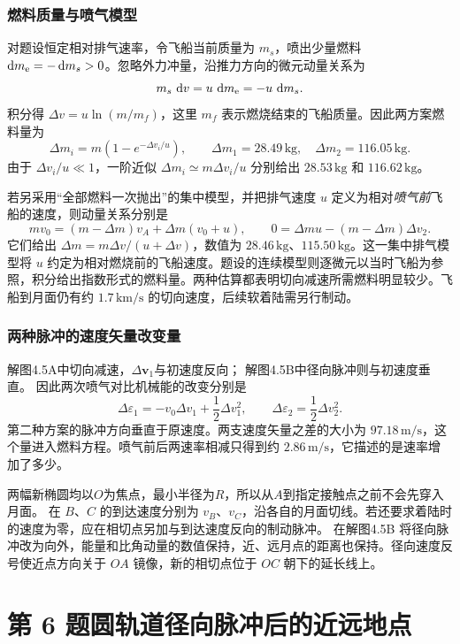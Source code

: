 \documentclass[UTF8,fontset=fandol,a4paper,11pt]{ctexart}
\newcommand{\dd}{\mathop{}\!\mathrm{d}}
\newcommand{\vect}[1]{\bm{#1}}
\begin{document}
\subsubsection*{燃料质量与喷气模型}
对题设恒定相对排气速率，令飞船当前质量为 $m_s$，喷出少量燃料 $\dd m_{\rm e}=-\dd m_s>0$。忽略外力冲量，沿推力方向的微元动量关系为
\[
m_s\,\dd v=u\,\dd m_{\rm e}=-u\,\dd m_s.
\]
积分得 $\Delta v=u\ln(m/m_f)$，这里 $m_f$ 表示燃烧结束的飞船质量。因此两方案燃料量为
\[
\boxed{\Delta m_i=m\left(1-e^{-\Delta v_i/u}\right)},
\qquad \Delta m_1=28.49\,\mathrm{kg},\quad
\Delta m_2=116.05\,\mathrm{kg}.
\]
由于 $\Delta v_i/u\ll1$，一阶近似 $\Delta m_i\simeq m\Delta v_i/u$ 分别给出 $28.53\,\mathrm{kg}$ 和 $116.62\,\mathrm{kg}$。

若另采用“全部燃料一次抛出”的集中模型，并把排气速度 $u$ 定义为相对\emph{喷气前}飞船的速度，则动量关系分别是
\[
mv_0=(m-\Delta m)v_A+\Delta m(v_0+u),\qquad
0=\Delta m u-(m-\Delta m)\Delta v_2.
\]
它们给出 $\Delta m=m\Delta v/(u+\Delta v)$，数值为 $28.46\,\mathrm{kg}$、$115.50\,\mathrm{kg}$。这一集中排气模型将 $u$ 约定为相对燃烧前的飞船速度。题设的连续模型则逐微元以当时飞船为参照，积分给出指数形式的燃料量。两种估算都表明切向减速所需燃料明显较少。飞船到月面仍有约 $1.7\,\mathrm{km/s}$ 的切向速度，后续软着陆需另行制动。
\subsubsection*{两种脉冲的速度矢量改变量}
解图4.5A中切向减速，$\Delta\vect v_1$与初速度反向；
解图4.5B中径向脉冲则与初速度垂直。
因此两次喷气对比机械能的改变分别是
\[
\Delta\varepsilon_1=-v_0\Delta v_1+\frac12\Delta v_1^2,
\qquad
\Delta\varepsilon_2=\frac12\Delta v_2^2.
\]
第二种方案的脉冲方向垂直于原速度。两支速度矢量之差的大小为 $97.18\,\mathrm{m/s}$，这个量进入燃料方程。喷气前后两速率相减只得到约 $2.86\,\mathrm{m/s}$，它描述的是速率增加了多少。

两幅新椭圆均以$O$为焦点，最小半径为$R$，所以从$A$到指定接触点之前不会先穿入月面。
在 $B$、$C$ 的到达速度分别为 $v_B$、$v_C$，沿各自的月面切线。若还要求着陆时的速度为零，应在相切点另加与到达速度反向的制动脉冲。
在解图4.5B 将径向脉冲改为向外，能量和比角动量的数值保持，近、远月点的距离也保持。径向速度反号使近点方向关于 $OA$ 镜像，新的相切点位于 $OC$ 朝下的延长线上。




\section*{第 6 题\quad 圆轨道径向脉冲后的近远地点}
\end{document}

